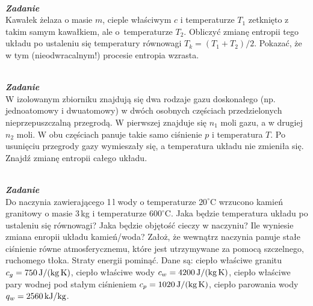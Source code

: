 \documentclass[11pt,a4paper]{article}
\newcounter{zadanie}\newcommand{\zadanie}[1][]{\addtocounter{zadanie}{1} ~\\  {\bf \emph{Zadanie \arabic{zadanie} #1 }} \\}
\renewcommand{\t}[1]{\textrm{#1}}
\begin{document}



\zadanie
Kawałek żelaza o masie $m$, cieple właściwym $c$ i temperaturze $T_1$ zetknięto
z takim samym kawałkiem, ale o~temperaturze $T_2$.
Obliczyć zmianę entropii tego układu po ustaleniu się temperatury
równowagi \mbox{$T_k = (T_1+T_2)/2$}. Pokazać, że w tym (nieodwracalnym!)
procesie entropia wzrasta.
\newline



\zadanie
W izolowanym zbiorniku znajdują się dwa rodzaje gazu doskonałego (np. jednoatomowy i dwuatomowy)
w dwóch osobnych częściach przedzielonych nieprzepuszczalną przegrodą.
W pierwszej znajduje się $n_1$ moli gazu, a w drugiej $n_2$ moli.
W obu częściach panuje takie samo ciśnienie $p$ i temperatura $T$.
Po usunięciu przegrody gazy wymieszały się, a temperatura układu nie zmieniła się.
Znajdź zmianę entropii całego układu.
\newline

\zadanie
Do naczynia zawierającego 1\,l wody o temperaturze $20^\circ$C wrzucono kamień granitowy
o masie 3\,kg i temperaturze $600^\circ$C. Jaka będzie temperatura układu
po ustaleniu się równowagi? Jaka będzie objętość cieczy w naczyniu?
Ile wyniesie zmiana enropii  układu kamień/woda?
Założ, że wewnątrz naczynia panuje stałe ciśnienie równe
atmosferycznemu, które jest utrzymywane za pomocą szczelnego, ruchomego tłoka.
Straty energii pominąć.
Dane są:
ciepło właściwe granitu $c_g = 750\,{\rm J/(kg\, K)}$,
ciepło właściwe wody $c_w = 4200\,{\rm J/(kg\, K)}$,
ciepło właściwe pary wodnej pod stałym ciśnieniem $c_p = 1020\,{\rm J/(kg\, K)}$,
ciepło parowania wody $q_w = 2560\,{\rm kJ/kg}$.
\newline

\noindent
\end{document}
